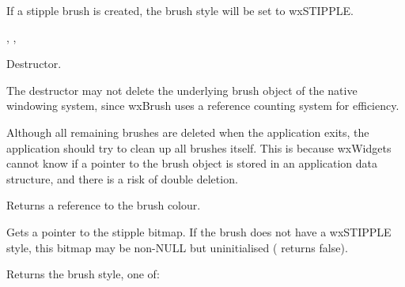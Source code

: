 
If a stipple brush is created, the brush style will be set to wxSTIPPLE.


, , 

\label{wxbrushdtor}


Destructor.


The destructor may not delete the underlying brush object of the native windowing
system, since wxBrush uses a reference counting system for efficiency.

Although all remaining brushes are deleted when the application exits,
the application should try to clean up all brushes itself. This is because
wxWidgets cannot know if a pointer to the brush object is stored in an
application data structure, and there is a risk of double deletion.

\label{wxbrushgetcolour}


Returns a reference to the brush colour.



\label{wxbrushgetstipple}


Gets a pointer to the stipple bitmap. If the brush does not have a wxSTIPPLE style,
this bitmap may be non-NULL but uninitialised ( returns false).



\label{wxbrushgetstyle}


Returns the brush style, one of:

\begin{twocollist}\itemsep=0pt
\end{twocollist}

